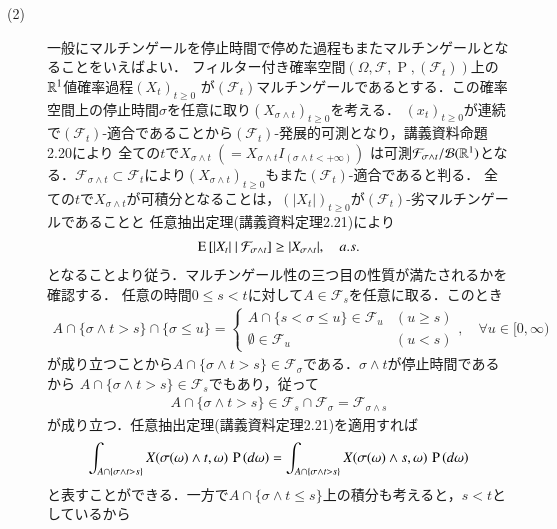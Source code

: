 \begin{prf}
\begin{description}
	\item[(2)] 一般にマルチンゲールを停止時間で停めた過程もまたマルチンゲールとなることをいえばよい．
		フィルター付き確率空間$(\Omega, \mathcal{F}, \operatorname{P}, (\mathcal{F}_t))$上の$\mathbb{R}^1$値確率過程$(X_t)_{t \geq 0}$
		が$(\mathcal{F}_t)$マルチンゲールであるとする．この確率空間上の停止時間$\sigma$を任意に取り$(X_{\sigma \wedge t})_{t \geq 0}$を考える．
		$(x_t)_{t \geq 0}$が連続で$(\mathcal{F}_t)$-適合であることから$(\mathcal{F}_t)$-発展的可測となり，講義資料命題2.20により
		全ての$t$で$X_{\sigma \wedge t}\ \left(= X_{\sigma \wedge t}I_{(\sigma \wedge t < +\infty)}\right)$
		は可測$\mathcal{F}_{\sigma \wedge t}/\mathcal{B}(\mathbb{R}^1)$となる．$\mathcal{F}_{\sigma \wedge t}
		\subset \mathcal{F}_t$により$(X_{\sigma \wedge t})_{t \geq 0}$もまた$(\mathcal{F}_t)$-適合であると判る．
		全ての$t$で$X_{\sigma \wedge t}$が可積分となることは，$(|X_t|)_{t \geq 0}$が$(\mathcal{F}_t)$-劣マルチンゲールであることと
		任意抽出定理(講義資料定理2.21)により
		\begin{align}
			\operatorname{E} \left[ |X_t|\ |\ \mathcal{F}_{\sigma \wedge t} \right] \geq |X_{\sigma \wedge t}|, \quad a.s.
		\end{align}
		となることより従う．マルチンゲール性の三つ目の性質が満たされるかを確認する．
		任意の時間$0 \leq s < t$に対して$A \in \mathcal{F}_s$を任意に取る．このとき
		\begin{align}
			A \cap \{ \sigma \wedge t > s \} \cap \{\sigma \leq u\} = \begin{cases}
				A \cap \{s < \sigma \leq u\} \in \mathcal{F}_u & (u \geq s) \\
				\emptyset \in \mathcal{F}_u & (u < s)
			\end{cases}, \quad \forall u \in [0,\infty)
		\end{align}
		が成り立つことから$A \cap \{ \sigma \wedge t > s \} \in \mathcal{F}_{\sigma}$である．$\sigma \wedge t$が停止時間であるから
		$A \cap \{ \sigma \wedge t > s \} \in \mathcal{F}_s$でもあり，従って
		\begin{align}
			A \cap \{ \sigma \wedge t > s \} \in \mathcal{F}_s \cap \mathcal{F}_{\sigma} = \mathcal{F}_{\sigma \wedge s}
		\end{align}
		が成り立つ．任意抽出定理(講義資料定理2.21)を適用すれば
		\begin{align}
			\int_{A \cap \{ \sigma \wedge t > s \}} X(\sigma(\omega) \wedge t, \omega)\, \operatorname{P} \left(d\omega\right)
			= \int_{A \cap \{ \sigma \wedge t > s \}} X(\sigma(\omega) \wedge s, \omega)\, \operatorname{P} \left(d\omega\right)
		\end{align}
		と表すことができる．一方で$A \cap \{ \sigma \wedge t \leq s \}$上の積分も考えると，$s < t$としているから

\end{description}
\end{prf}
